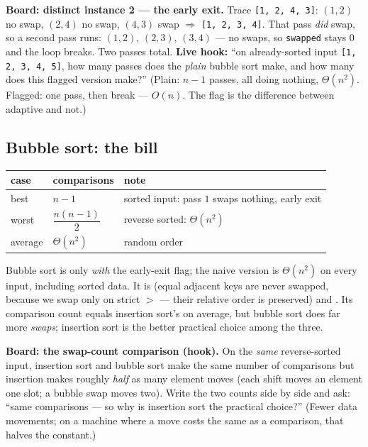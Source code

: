 \documentclass[11pt]{article}
\begin{document}
\textbf{Board: distinct instance 2 --- the early exit.} Trace \texttt{[1, 2, 4, 3]}: $(1,2)$ no swap, $(2,4)$ no swap, $(4,3)$ swap $\Rightarrow$ \texttt{[1, 2, 3, 4]}. That pass \emph{did} swap, so a second pass runs: $(1,2)$, $(2,3)$, $(3,4)$ --- no swaps, so \texttt{swapped} stays $0$ and the loop breaks. Two passes total. \textbf{Live hook:} ``on already-sorted input \texttt{[1, 2, 3, 4, 5]}, how many passes does the \emph{plain} bubble sort make, and how many does this flagged version make?'' (Plain: $n-1$ passes, all doing nothing, $\Theta(n^2)$. Flagged: one pass, then break --- $O(n)$. The flag is the difference between adaptive and not.)

\subsection{Bubble sort: the bill}

\begin{center}
{\footnotesize
\begin{tabular}{lll}
  \toprule
  \textbf{case} & \textbf{comparisons} & \textbf{note} \\
  \midrule
  best & $n-1$ & sorted input: pass $1$ swaps nothing, early exit \\
  worst & $\dfrac{n(n-1)}{2}$ & reverse sorted: $\Theta(n^2)$ \\
  average & $\Theta(n^2)$ & random order \\
  \bottomrule
\end{tabular}}
\end{center}

Bubble sort is  only \emph{with} the early-exit flag; the naive version is $\Theta(n^2)$ on every input, including sorted data. It is  (equal adjacent keys are never swapped, because we swap only on strict $>$ --- their relative order is preserved) and . Its comparison count equals insertion sort's on average, but bubble sort does far more \emph{swaps}; insertion sort is the better practical choice among the three. 

\textbf{Board: the swap-count comparison (hook).} On the \emph{same} reverse-sorted input, insertion sort and bubble sort make the same number of comparisons but insertion makes roughly \emph{half} as many element moves (each shift moves an element one slot; a bubble swap moves two). Write the two counts side by side and ask: ``same comparisons --- so why is insertion sort the practical choice?'' (Fewer data movements; on a machine where a move costs the same as a comparison, that halves the constant.)
\end{document}
